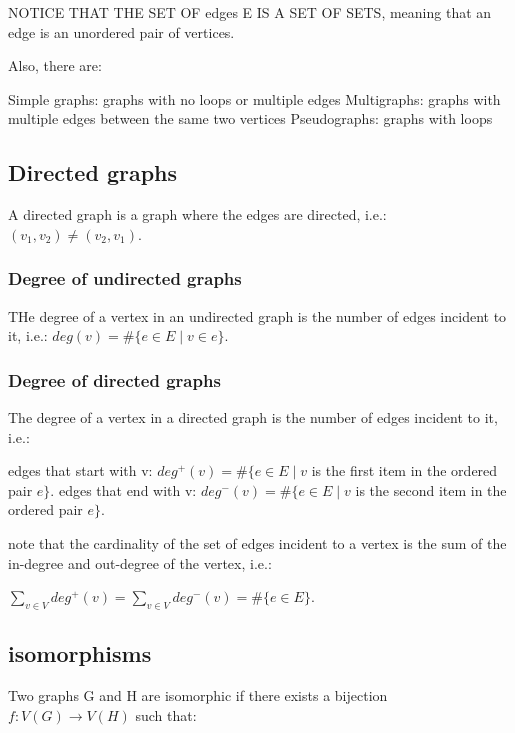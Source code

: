 \documentclass{article}
\begin{document}
NOTICE THAT THE SET OF edges E IS A SET OF SETS, meaning that an edge is an unordered pair of vertices.

Also, there are:

\begin{outline}
    \1 Simple graphs: graphs with no loops or multiple edges
    \1 Multigraphs: graphs with multiple edges between the same two vertices
    \1 Pseudographs: graphs with loops
\end{outline}

\subsection{Directed graphs}

A directed graph is a graph where the edges are directed, i.e.: $(v_1, v_2) \neq (v_2, v_1)$.

\subsubsection{Degree of undirected graphs}

THe degree of a vertex in an undirected graph is the number of edges incident to it, i.e.: $deg(v) = \#\{e \in E \mid v \in e\}$.

\subsubsection{Degree of directed graphs}

The degree of a vertex in a directed graph is the number of edges incident to it, i.e.:
\begin{outline}
    \1 edges that start with v: $deg^+(v) = \#\{e \in E \mid v $ is the first item in the ordered pair $ e\}$.
    \1 edges that end with v: $deg^-(v) = \#\{e \in E \mid v $ is the second item in the ordered pair $ e\}$.
\end{outline}

note that the cardinality of the set of edges incident to a vertex is the sum of the in-degree and out-degree of the vertex, i.e.:

$ \sum_{v \in V} deg^+(v) = \sum_{v \in V} deg^-(v) = \#\{e \in E\} $.

\subsection{isomorphisms}

Two graphs G and H are isomorphic if there exists a bijection $f : V(G) \rightarrow V(H)$ such that:
\end{document}
